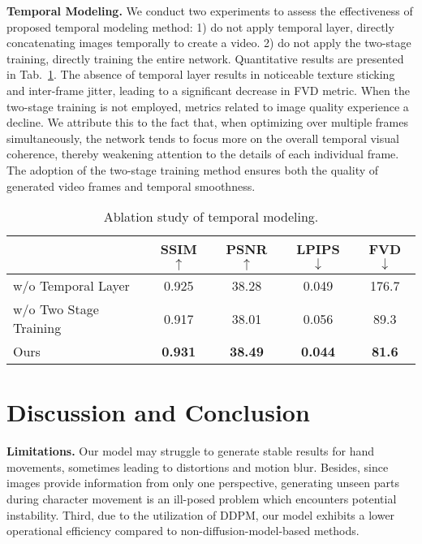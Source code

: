 \noindent
\textbf{Temporal Modeling. }
We conduct two experiments to assess the effectiveness of proposed temporal modeling method: 
1) do not apply temporal layer, directly concatenating images temporally to create a video. 
2) do not apply the two-stage training, directly training the entire network. 
Quantitative results are presented in Tab.~\ref{table:temporal}. The absence of temporal layer results in noticeable texture sticking and inter-frame jitter, leading to a significant decrease in FVD metric. When the two-stage training is not employed, metrics related to image quality experience a decline. We attribute this to the fact that, when optimizing over multiple frames simultaneously, the network tends to focus more on the overall temporal visual coherence, thereby weakening attention to the details of each individual frame. The adoption of the two-stage training method ensures both the quality of generated video frames and temporal smoothness. 

\begin{table}
    \setlength{\tabcolsep}{2pt}
	\centering
\begin{center}
\begin{tabular}{lcccc} 

\hline
    & SSIM $\uparrow$ & PSNR $\uparrow$ & LPIPS $\downarrow$  & FVD $\downarrow$ \\
 \hline
 w/o Temporal Layer     & 0.925 & 38.28 & 0.049    & 176.7 \\
 w/o Two Stage Training    & 0.917 & 38.01 & 0.056  & 89.3 \\
Ours & \textbf{0.931} & \textbf{38.49} & \textbf{0.044}  & \textbf{81.6} \\
 
\hline
\end{tabular}
\end{center}    \vspace{-0.5cm}
	\caption{Ablation study of temporal modeling.}
    \vspace{-0.3cm}
	\label{table:temporal}
\end{table}

\section{Discussion and Conclusion}

\noindent
\textbf{Limitations. }
Our model may struggle to generate stable results for hand movements, sometimes leading to distortions and motion blur. 
Besides, since images provide information from only one perspective, generating unseen parts during character movement is an ill-posed problem which encounters potential instability. 
Third, due to the utilization of DDPM, our model exhibits a lower operational efficiency compared to non-diffusion-model-based methods.

